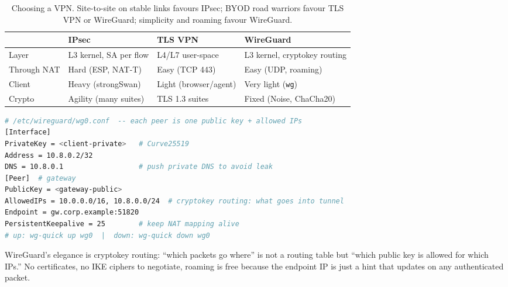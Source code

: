 \begin{table}[h]\centering\small
\begin{tabular}{l l l l}
\toprule & \textbf{IPsec} & \textbf{TLS VPN} & \textbf{WireGuard} \\ \midrule
Layer & L3 kernel, SA per flow & L4/L7 user-space & L3 kernel, cryptokey routing \\
Through NAT & Hard (ESP, NAT-T) & Easy (TCP 443) & Easy (UDP, roaming) \\
Client & Heavy (strongSwan) & Light (browser/agent) & Very light (\texttt{wg}) \\
Crypto & Agility (many suites) & TLS 1.3 suites & Fixed (Noise, ChaCha20) \\ \bottomrule
\end{tabular}
\caption{Choosing a VPN. Site-to-site on stable links favours IPsec; BYOD road warriors favour TLS VPN or WireGuard; simplicity and roaming favour WireGuard.}
\end{table}

\begin{lstlisting}[language=bash,caption={WireGuard: minimal site-to-site and client config.},label={lst:wg}]
# /etc/wireguard/wg0.conf  -- each peer is one public key + allowed IPs
[Interface]
PrivateKey = <client-private>   # Curve25519
Address = 10.8.0.2/32
DNS = 10.8.0.1                  # push private DNS to avoid leak
[Peer]  # gateway
PublicKey = <gateway-public>
AllowedIPs = 10.0.0.0/16, 10.8.0.0/24  # cryptokey routing: what goes into tunnel
Endpoint = gw.corp.example:51820
PersistentKeepalive = 25        # keep NAT mapping alive
# up: wg-quick up wg0  |  down: wg-quick down wg0
\end{lstlisting}

WireGuard's elegance is cryptokey routing: ``which packets go where'' is not
a routing table but ``which public key is allowed for which IPs.'' No
certificates, no IKE ciphers to negotiate, roaming is free because the
endpoint IP is just a hint that updates on any authenticated packet.

